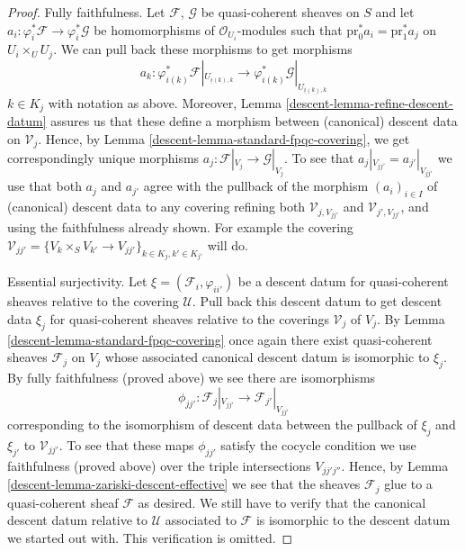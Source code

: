 \begin{proof}
\medskip\noindent
Fully faithfulness. Let $\mathcal{F}$, $\mathcal{G}$ be quasi-coherent
sheaves on $S$ and let
$a_i : \varphi_i^*\mathcal{F} \to \varphi_i^*\mathcal{G}$ be
homomorphisms of $\mathcal{O}_{U_i}$-modules such that
$\text{pr}_0^*a_i = \text{pr}_1^*a_j$ on $U_i \times_U U_j$.
We can pull back these morphisms to get morphisms
$$
a_k :
\varphi_{i(k)}^*\mathcal{F}|_{U_{\underline{i}(k), k}}
\longrightarrow
\varphi_{i(k)}^*\mathcal{G}|_{U_{\underline{i}(k), k}}
$$
$k \in K_j$ with notation as above. Moreover,
Lemma \ref{descent-lemma-refine-descent-datum} assures us
that these define a morphism between (canonical) descent data on
$\mathcal{V}_j$. Hence, by
Lemma \ref{descent-lemma-standard-fpqc-covering}, we get correspondingly
unique morphisms $a_j : \mathcal{F}|_{V_j} \to \mathcal{G}|_{V_j}$.
To see that $a_j|_{V_{jj'}} = a_{j'}|_{V_{jj'}}$ we use that
both $a_j$ and $a_{j'}$ agree with the pullback of the morphism
$(a_i)_{i \in I}$ of (canonical) descent data to any covering
refining both $\mathcal{V}_{j, V_{jj'}}$ and
$\mathcal{V}_{j', V_{jj'}}$, and using the faithfulness already
shown. For example the covering
$\mathcal{V}_{jj'} =
\{V_k \times_S V_{k'} \to V_{jj'}\}_{k \in K_j, k' \in K_{j'}}$
will do.

\medskip\noindent
Essential surjectivity. Let $\xi = (\mathcal{F}_i, \varphi_{ii'})$
be a descent datum for quasi-coherent sheaves relative to the covering
$\mathcal{U}$. Pull back this descent datum to get descent data
$\xi_j$ for quasi-coherent sheaves relative to the coverings
$\mathcal{V}_j$ of $V_j$. By Lemma \ref{descent-lemma-standard-fpqc-covering}
once again there exist
quasi-coherent sheaves $\mathcal{F}_j$ on $V_j$ whose associated
canonical descent datum is isomorphic to $\xi_j$. By fully faithfulness
(proved above) we see there are isomorphisms
$$
\phi_{jj'} :
\mathcal{F}_j|_{V_{jj'}}
\longrightarrow
\mathcal{F}_{j'}|_{V_{jj'}}
$$
corresponding to the isomorphism of descent data between the pullback
of $\xi_j$ and $\xi_{j'}$ to $\mathcal{V}_{jj'}$. To see that these
maps $\phi_{jj'}$ satisfy the cocycle condition we use faithfulness
(proved above) over the triple intersections $V_{jj'j''}$. Hence, by
Lemma \ref{descent-lemma-zariski-descent-effective}
we see that the sheaves $\mathcal{F}_j$
glue to a quasi-coherent sheaf $\mathcal{F}$ as desired.
We still have to verify that the canonical descent datum relative to
$\mathcal{U}$ associated to $\mathcal{F}$ is isomorphic to the descent
datum we started out with. This verification is omitted.
\end{proof}


